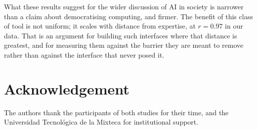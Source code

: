 \documentclass[10pt,a4paper]{article}
\begin{document}
What these results suggest for the wider discussion of AI in society is narrower than a claim about democratising computing, and firmer. The benefit of this class of tool is not uniform; it scales with distance from expertise, at $r = 0.97$ in our data. That is an argument for building such interfaces where that distance is greatest, and for measuring them against the barrier they are meant to remove rather than against the interface that never posed it.


\section*{Acknowledgement}

The authors thank the participants of both studies for their time, and the Universidad Tecnol\'{o}gica de la Mixteca for institutional support.

{
\fontsize{9}{10.8}\selectfont
\setlength{\bibsep}{2pt}

}
\end{document}
